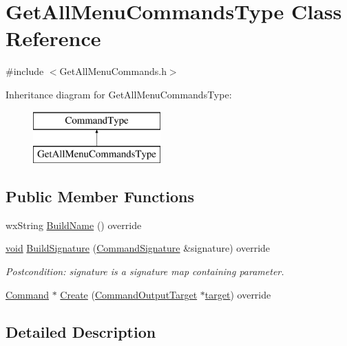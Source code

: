 \hypertarget{class_get_all_menu_commands_type}{}\section{Get\+All\+Menu\+Commands\+Type Class Reference}
\label{class_get_all_menu_commands_type}


{\ttfamily \#include $<$Get\+All\+Menu\+Commands.\+h$>$}

Inheritance diagram for Get\+All\+Menu\+Commands\+Type\+:\begin{figure}[H]
\begin{center}
\leavevmode
\includegraphics[height=2.000000cm]{class_get_all_menu_commands_type}
\end{center}
\end{figure}
\subsection*{Public Member Functions}
\begin{DoxyCompactItemize}
\item 
wx\+String \hyperlink{class_get_all_menu_commands_type_af5c62be834672b47d9dd44942706aac9}{Build\+Name} () override
\item 
\hyperlink{sound_8c_ae35f5844602719cf66324f4de2a658b3}{void} \hyperlink{class_get_all_menu_commands_type_a72fedbc08c22babe72b6564c12a6221d}{Build\+Signature} (\hyperlink{class_command_signature}{Command\+Signature} \&signature) override
\begin{DoxyCompactList}\small\item\em Postcondition\+: signature is a \textquotesingle{}signature\textquotesingle{} map containing parameter. \end{DoxyCompactList}\item 
\hyperlink{class_command}{Command} $\ast$ \hyperlink{class_get_all_menu_commands_type_aa9121aa23bcb847a1cac9f13bd1f6464}{Create} (\hyperlink{class_command_output_target}{Command\+Output\+Target} $\ast$\hyperlink{lib_2expat_8h_a15a257516a87decb971420e718853137}{target}) override
\end{DoxyCompactItemize}


\subsection{Detailed Description}


